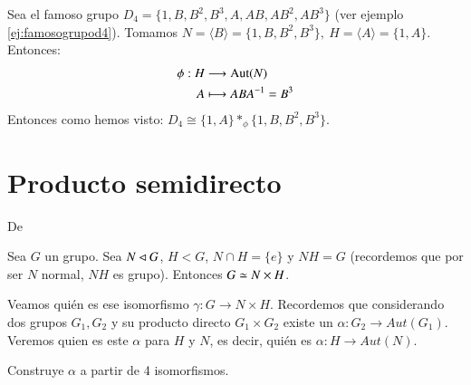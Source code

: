 \begin{ej}
	Sea el famoso grupo $D_4 = \{1,B,B^2,B^3,A,AB,AB^2,AB^3\}$ (ver ejemplo \ref{ej:famosogrupod4}). Tomamos $N = \langle B \rangle =\{1,B,B^2,B^3\},\ H = \langle A \rangle =\{1,A\}$. Entonces:
	\begin{align*}
	\phi: H &\longrightarrow \text{Aut}(N)\\
	A &\longmapsto ABA^{-1} = B^3
	\end{align*}
	Entonces como hemos visto: $D_4 \cong \{1,A\} \ast_\phi \{1,B,B^2,B^3\}$.
\end{ej}

\section{Producto semidirecto}

De \cite{dor96}




Sea $G$ un grupo. Sea $N \lhd G$, $H < G$, $N \cap H = \{e\}$ y $NH = G$ (recordemos que por ser $N$ normal, $NH$ es grupo). Entonces $G \simeq N \times H$.

Veamos quién es ese isomorfismo $\gamma : G \to N \times H$. Recordemos que considerando dos grupos $G_1, G_2$ y su producto directo $G_1 \times G_2$ existe un $\alpha : G_2 \to Aut(G_1)$. Veremos quien es este $\alpha$ para $H$ y $N$, es decir, quién es $\alpha: H \to Aut(N)$.

Construye $\alpha$ a partir de 4 isomorfismos.

